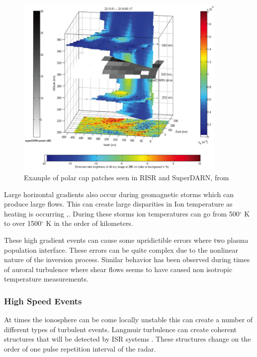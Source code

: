 \begin{figure}[!t]
\centering
\includegraphics[width=4.0in]{patches}
\caption{Example of polar cap patches seen in RISR and SuperDARN, from \cite{Dahlgren:2012dq}}
\label{fig:patches}
\end{figure}

Large horizontal gradients also occur during geomagnetic storms which can produce large flows.  This can create large disparities in Ion temperature as heating is occurring \cite{Zettergren:2008ba},\cite{semeter:plasmatransport2012}.  During these storms ion temperatures can go from 500$^\circ$ K to over 1500$^\circ$ K in the order of kilometers.

These high gradient events can cause some upridictible errors where two plasma population interface.  These errors can be quite complex due to the nonlinear nature of the inversion process\cite{Vallinkoski1990665}.  Similar behavior has been observed during times of auroral turbulence where shear flows seems to have caused non isotropic temperature measurements\cite{knudsen1993}. 

\subsubsection{High Speed Events}
At times the ionosphere can be come locally unstable this can create a number of different types of turbulent events. Langmuir turbulence can create coherent structures that will be detected by ISR systems \cite{akbari:2013lt}.  These structures change on the order of one pulse repetition interval of the radar.

